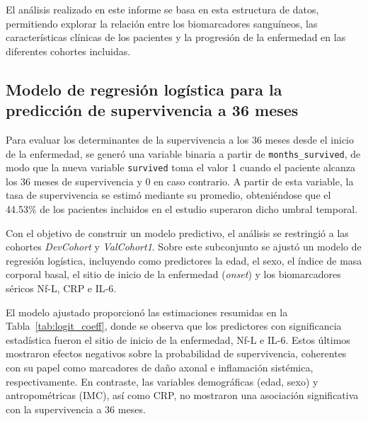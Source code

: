\documentclass[12pt]{article} %
\begin{document}
El análisis realizado en este informe se basa en esta estructura de datos, permitiendo explorar la relación entre los biomarcadores sanguíneos, las características clínicas de los pacientes y la progresión de la enfermedad en las diferentes cohortes incluidas.

\subsection{Modelo de regresión logística para la predicción de supervivencia a 36 meses}

Para evaluar los determinantes de la supervivencia a los 36 meses desde el inicio de la enfermedad, se generó una variable binaria a partir de \texttt{months\_survived}, de modo que la nueva variable \texttt{survived} toma el valor 1 cuando el paciente alcanza los 36 meses de supervivencia y 0 en caso contrario. A partir de esta variable, la tasa de supervivencia se estimó mediante su promedio, obteniéndose que el 44.53\% de los pacientes incluidos en el estudio superaron dicho umbral temporal.

Con el objetivo de construir un modelo predictivo, el análisis se restringió a las cohortes \textit{DevCohort} y \textit{ValCohort1}. Sobre este subconjunto se ajustó un modelo de regresión logística, incluyendo como predictores la edad, el sexo, el índice de masa corporal basal, el sitio de inicio de la enfermedad (\textit{onset}) y los biomarcadores séricos Nf-L, CRP e IL-6.

El modelo ajustado proporcionó las estimaciones resumidas en la Tabla~\ref{tab:logit_coeff}, donde se observa que los predictores con significancia estadística fueron el sitio de inicio de la enfermedad, Nf-L e IL-6. Estos últimos mostraron efectos negativos sobre la probabilidad de supervivencia, coherentes con su papel como marcadores de daño axonal e inflamación sistémica, respectivamente. En contraste, las variables demográficas (edad, sexo) y antropométricas (IMC), así como CRP, no mostraron una asociación significativa con la supervivencia a 36 meses.
\end{document}
